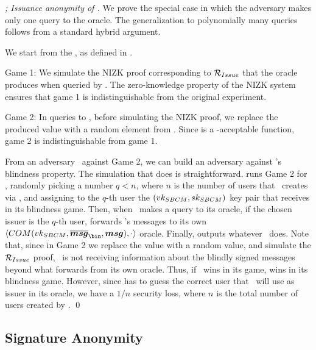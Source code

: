 \begin{proof}[; Issuance anonymity of \CUASGen]
  We prove the special case in which the adversary makes only one query to the
  \OBTCHALb oracle. The generalization to polynomially many queries follows
  from a standard hybrid argument.

  We start from the \ExpIssAnonb, as defined in . 

  Game 1: We simulate the NIZK proof corresponding to $\mathcal{R}_{Issue}$ that
  the \OBTCHALb oracle produces when queried by \adv. The zero-knowledge
  property of the NIZK system ensures that game 1 is indistinguishable from
  the original experiment.

  Game 2: In queries to \OBTCHALb, before simulating the NIZK proof, we replace
  the produced \yissue value with a random element from \rngfissue. Since
  \fissue is a \UAS-acceptable function, game 2 is indistinguishable from game
  1.

  From an adversary \adv~against Game 2, we can build an adversary \advB against
  \SBCM's blindness property. The simulation that
  \advB does is straightforward. \advB runs Game 2 for \adv, randomly picking
  a number $q < n$, where $n$ is the number of users that \adv~creates via
  \UGEN, and assigning to the $q$-th user the $(vk_{SBCM},sk_{SBCM})$ key pair
  that \advB receives in its blindness game. Then, when \adv~makes a query
  to its \OBTCHALb oracle, if the chosen issuer is the $q$-th user, \advB
  forwards \adv's messages to its own $\langle COM(\SBCMvk,
  \overline{\smsg}_{\bin},\smsg),\cdot\rangle$ oracle. Finally, \advB outputs
  whatever \adv~does. Note that, since in Game 2 we replace the \yissue value
  with a random value, and simulate the $\mathcal{R}_{Issue}$ proof, \adv~is not
  receiving information about the blindly signed messages beyond what \advB
  forwards from its own oracle. Thus, if \adv~wins in its game, \advB wins in
  its blindness game. However, since \advB has to guess the correct user
  that \adv~will use as issuer in its \OBTCHALb oracle, we have a $1/n$ security
  loss, where $n$ is the total number of users created by \adv.
  \qed
\end{proof}

\subsection{Signature Anonymity}

